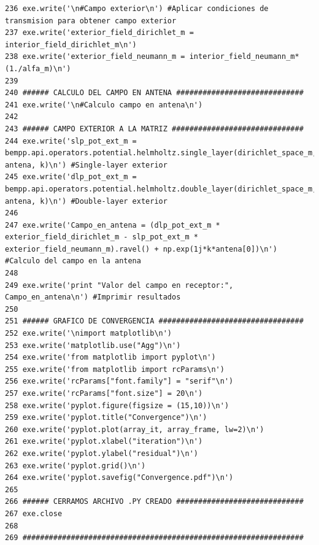 \documentclass[12pt,letterpaper]{article}
\numberwithin{equation}{section}
\begin{document}
\begin{lstlisting}
236 exe.write('\n#Campo exterior\n') #Aplicar condiciones de transmision para obtener campo exterior 
237 exe.write('exterior_field_dirichlet_m = interior_field_dirichlet_m\n')
238 exe.write('exterior_field_neumann_m = interior_field_neumann_m*(1./alfa_m)\n')
239 
240 ###### CALCULO DEL CAMPO EN ANTENA #############################
241 exe.write('\n#Calculo campo en antena\n')
242 
243 ###### CAMPO EXTERIOR A LA MATRIZ ##############################
244 exe.write('slp_pot_ext_m = bempp.api.operators.potential.helmholtz.single_layer(dirichlet_space_m, antena, k)\n') #Single-layer exterior
245 exe.write('dlp_pot_ext_m = bempp.api.operators.potential.helmholtz.double_layer(dirichlet_space_m, antena, k)\n') #Double-layer exterior
246 
247 exe.write('Campo_en_antena = (dlp_pot_ext_m * exterior_field_dirichlet_m - slp_pot_ext_m * exterior_field_neumann_m).ravel() + np.exp(1j*k*antena[0])\n') #Calculo del campo en la antena
248 
249 exe.write('print "Valor del campo en receptor:", Campo_en_antena\n') #Imprimir resultados
250 
251 ###### GRAFICO DE CONVERGENCIA #################################
252 exe.write('\nimport matplotlib\n')
253 exe.write('matplotlib.use("Agg")\n')
254 exe.write('from matplotlib import pyplot\n')
255 exe.write('from matplotlib import rcParams\n')
256 exe.write('rcParams["font.family"] = "serif"\n')
257 exe.write('rcParams["font.size"] = 20\n')
258 exe.write('pyplot.figure(figsize = (15,10))\n')
259 exe.write('pyplot.title("Convergence")\n')
260 exe.write('pyplot.plot(array_it, array_frame, lw=2)\n')
261 exe.write('pyplot.xlabel("iteration")\n')
262 exe.write('pyplot.ylabel("residual")\n')
263 exe.write('pyplot.grid()\n')
264 exe.write('pyplot.savefig("Convergence.pdf")\n')
265 
266 ###### CERRAMOS ARCHIVO .PY CREADO #############################
267 exe.close
268 
269 ################################################################

\end{lstlisting}
\pagebreak
\end{document}
